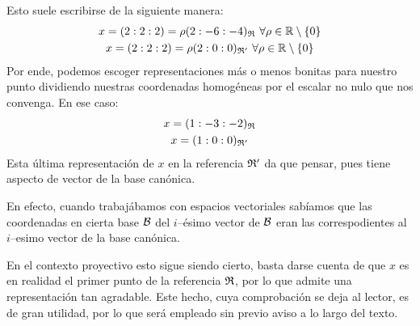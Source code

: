 \begin{exa}
	Esto suele escribirse de la siguiente manera:
	\begin{gather*}
		x=(2:2:2)=\rho(2:-6:-4)_{\mathfrak{R}}\ \forall \rho\in\mathbb{R}\setminus\{0\}\\
		x=(2:2:2)=\rho(2:0:0)_{\mathfrak{R}'}\ \forall \rho\in\mathbb{R}\setminus\{0\}
	\end{gather*}
	Por ende, podemos escoger representaciones más o menos bonitas para nuestro punto dividiendo nuestras coordenadas homogéneas por el escalar no nulo que nos convenga. En ese caso:
	\begin{gather*}
		x=(1:-3:-2)_{\mathfrak{R}}\\
		x=(1:0:0)_{\mathfrak{R}'}
	\end{gather*}
	Esta última representación de $x$ en la referencia $\mathfrak{R}'$ da que pensar, pues tiene aspecto de vector de la base canónica.
	
	 En efecto, cuando trabajábamos con espacios vectoriales sabíamos que las coordenadas en cierta base $\mathcal{B}$ del $i$--ésimo vector de $\mathcal{B}$ eran las correspodientes al $i$--esimo vector de la base canónica.
	 
	 En el contexto proyectivo esto sigue siendo cierto, basta darse cuenta de que $x$ es en realidad el primer punto de la referencia $\mathfrak{R}$, por lo que admite una representación tan agradable. Este hecho, cuya comprobación se deja al lector, es de gran utilidad, por lo que será empleado sin previo aviso a lo largo del texto. 
\end{exa}